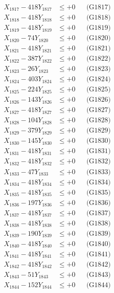 \documentclass[a4paper,10pt]{article}
\begin{document}
{\begin{align}
X_{1817} - 418Y_{1817} &\leq +0 && \text{(G1817)} \\
X_{1818} - 418Y_{1818} &\leq +0 && \text{(G1818)} \\
X_{1819} - 418Y_{1819} &\leq +0 && \text{(G1819)} \\
X_{1820} - 74Y_{1820} &\leq +0 && \text{(G1820)} \\
\allowbreak
X_{1821} - 418Y_{1821} &\leq +0 && \text{(G1821)} \\
X_{1822} - 387Y_{1822} &\leq +0 && \text{(G1822)} \\
X_{1823} - 26Y_{1823} &\leq +0 && \text{(G1823)} \\
X_{1824} - 403Y_{1824} &\leq +0 && \text{(G1824)} \\
X_{1825} - 224Y_{1825} &\leq +0 && \text{(G1825)} \\
X_{1826} - 143Y_{1826} &\leq +0 && \text{(G1826)} \\
X_{1827} - 418Y_{1827} &\leq +0 && \text{(G1827)} \\
X_{1828} - 104Y_{1828} &\leq +0 && \text{(G1828)} \\
X_{1829} - 379Y_{1829} &\leq +0 && \text{(G1829)} \\
X_{1830} - 145Y_{1830} &\leq +0 && \text{(G1830)} \\
\allowbreak
X_{1831} - 418Y_{1831} &\leq +0 && \text{(G1831)} \\
X_{1832} - 418Y_{1832} &\leq +0 && \text{(G1832)} \\
X_{1833} - 47Y_{1833} &\leq +0 && \text{(G1833)} \\
X_{1834} - 418Y_{1834} &\leq +0 && \text{(G1834)} \\
X_{1835} - 418Y_{1835} &\leq +0 && \text{(G1835)} \\
X_{1836} - 197Y_{1836} &\leq +0 && \text{(G1836)} \\
X_{1837} - 418Y_{1837} &\leq +0 && \text{(G1837)} \\
X_{1838} - 418Y_{1838} &\leq +0 && \text{(G1838)} \\
X_{1839} - 190Y_{1839} &\leq +0 && \text{(G1839)} \\
X_{1840} - 418Y_{1840} &\leq +0 && \text{(G1840)} \\
\allowbreak
X_{1841} - 418Y_{1841} &\leq +0 && \text{(G1841)} \\
X_{1842} - 418Y_{1842} &\leq +0 && \text{(G1842)} \\
X_{1843} - 51Y_{1843} &\leq +0 && \text{(G1843)} \\
X_{1844} - 152Y_{1844} &\leq +0 && \text{(G1844)} \\

\end{align}}
\end{document}
